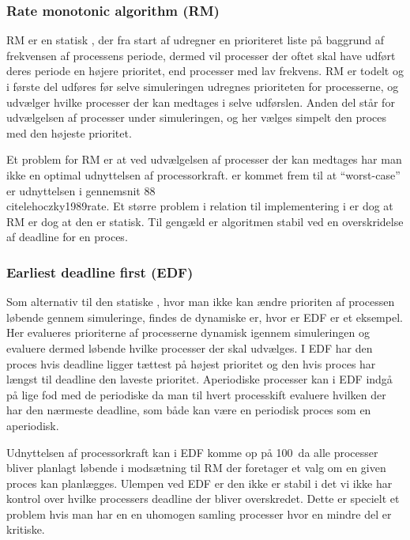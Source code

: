 \subsubsection{Rate monotonic algorithm (RM)}
RM er en statisk \sched, der fra start af udregner en prioriteret liste på baggrund af frekvensen af processens periode, dermed vil processer der oftet skal have udført deres periode en højere prioritet, end processer med lav frekvens. RM er todelt og i første del udføres før selve simuleringen udregnes  prioriteten for processerne, og udvælger hvilke processer der kan medtages i selve udførslen. Anden del står for udvælgelsen af processer  under simuleringen, og her vælges simpelt den proces med den højeste prioritet. 

Et problem for RM er at ved udvælgelsen af processer der kan medtages har man ikke en optimal udnyttelsen af processorkraft.  er kommet frem til at ``worst-case'' er udnyttelsen i gennemsnit 88\\cite{lehoczky1989rate}. Et større problem i relation til implementering i \pycsp er dog at RM er dog at den er statisk. Til gengæld er algoritmen stabil ved en overskridelse af deadline for en proces. 

\subsubsection{Earliest deadline first (EDF)}
Som alternativ til den statiske \sched, hvor man ikke kan ændre prioriten af processen løbende gennem simuleringe, findes de dynamiske \sched er, hvor er EDF er et eksempel. Her evalueres prioriterne af processerne dynamisk igennem simuleringen og evaluere dermed løbende hvilke processer der skal udvælges. I EDF har den proces hvis deadline ligger tættest på højest prioritet og den hvis proces har længst til deadline den laveste prioritet. Aperiodiske processer kan i EDF indgå på lige fod med de periodiske da man til hvert processkift evaluere hvilken der har den nærmeste deadline, som både kan være en periodisk proces som en aperiodisk.

Udnyttelsen af processorkraft kan i EDF komme op på 100\, da alle processer bliver planlagt løbende i modsætning til RM der foretager et valg om en given proces kan planlægges.  Ulempen ved EDF er den ikke er stabil i det vi ikke har kontrol over hvilke processers deadline der bliver overskredet. Dette er specielt et problem hvis man har en en uhomogen samling processer hvor en mindre del er kritiske.

